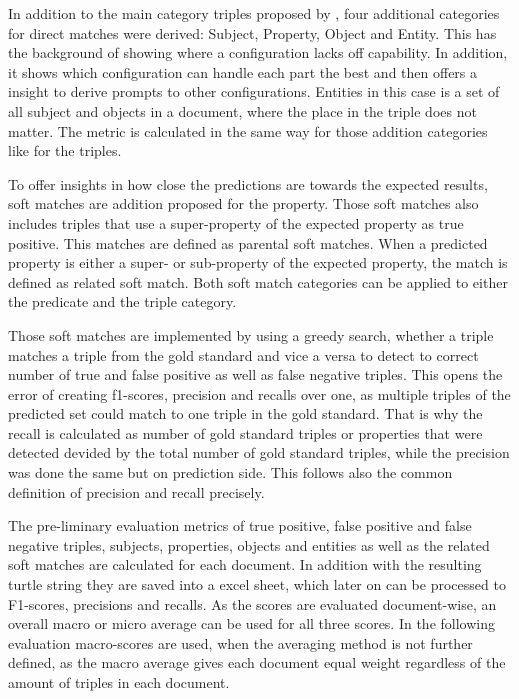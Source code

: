 \documentclass[a4paper,oneside,bibliography=totoc]{scrbook}
\begin{document}
In addition to the main category triples proposed by \citet{Josifoski2021}, four additional categories for direct matches were derived: Subject, Property, Object and Entity. This has the background of showing where a configuration lacks off capability. In addition, it shows which configuration can handle each part the best and then offers a insight to derive prompts to other configurations. Entities in this case is a set of all subject and objects in a document, where the place in the triple does not matter. The metric is calculated in the same way for those addition categories like for the triples.

To offer insights in how close the predictions are towards the expected results, soft matches are addition proposed for the property. Those soft matches also includes triples that use a super-property of the expected property as true positive. This matches are defined as parental soft matches. When a predicted property is either a super- or sub-property of the expected property, the match is defined as related soft match. Both soft match categories can be applied to either the predicate and the triple category.

Those soft matches are implemented by using a greedy search, whether a triple matches a triple from the gold standard and vice a versa to detect to correct number of true and false positive as well as false negative triples. This opens the error of creating f1-scores, precision and recalls over one, as multiple triples of the predicted set could match to one triple in the gold standard. That is why the recall is calculated as number of gold standard triples or properties that were detected devided by the total number of gold standard triples, while the precision was done the same but on prediction side. This follows also the common definition of precision and recall precisely.

The pre-liminary evaluation metrics of true positive, false positive and false negative triples, subjects, properties, objects and entities as well as the related soft matches are calculated for each document. In addition with the resulting turtle string they are saved into a excel sheet, which later on can be processed to F1-scores, precisions and recalls. As the scores are evaluated document-wise, an overall macro or micro average can be used for all three scores. In the following evaluation macro-scores are used, when the averaging method is not further defined, as the macro average gives each document equal weight regardless of the amount of triples in each document.
\end{document}

